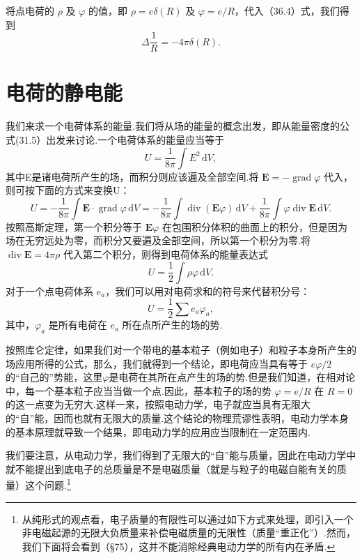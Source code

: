 将点电荷的 $\rho$ 及 $\varphi$ 的值，即 $\rho = e\delta(R)$ 及 $\varphi = e/R$，代入（36.4）式，我们得到
\begin{equation}
  \Delta\frac{1}{R}=-4\pi\delta(R).
\end{equation}

\section{电荷的静电能}

我们来求一个电荷体系的能量.我们将从场的能量的概念出发，即从能量密度的公式(31.5）出发来讨论.一个电荷体系的能量应当等于
\begin{equation*}
  U=\frac{1}{8\pi}\int E^2\,\mathrm{d}V,
\end{equation*}
其中E是诸电荷所产生的场，而积分则应该遍及全部空间.将 $\boldsymbol{E}=-\operatorname{grad}\varphi$ 代入，则可按下面的方式来变换U：
\begin{equation*}
  U=-\frac{1}{8\pi}\int\boldsymbol{E}\cdot\operatorname{grad}\varphi\,\mathrm{d}V
  =-\frac{1}{8\pi}\int\operatorname{div}(\boldsymbol{E}\varphi)\,\mathrm{d}V
  +\frac{1}{8\pi}\int\varphi\operatorname{div}\boldsymbol{E}\,\mathrm{d}V.
\end{equation*}
按照高斯定理，第一个积分等于 $\boldsymbol{E}\varphi$ 在包围积分体积的曲面上的积分，但是因为场在无穷远处为零，而积分又要遍及全部空间，所以第一个积分为零.将 $\operatorname{div}\boldsymbol{E}=4\pi\rho$ 代入第二个积分，则得到电荷体系的能量表达式
\begin{equation}
  U=\frac{1}{2}\int\rho\varphi\,\mathrm{d}V.
\end{equation}
对于一个点电荷体系 $e_a$，我们可以用对电荷求和的符号来代替积分号：
\begin{equation}
  U=\frac{1}{2}\sum e_a\varphi_a,
\end{equation}
其中，$\varphi_a$ 是所有电荷在 $e_a$ 所在点所产生的场的势.

按照库仑定律，如果我们对一个带电的基本粒子（例如电子）和粒子本身所产生的场应用所得的公式，那么，我们就得到一个结论，即电荷应当具有等于 $e\varphi/2$ 的“自己的”势能，这里$\varphi$是电荷在其所在点产生的场的势.但是我们知道，在相对论中，每一个基本粒子应当当做一个点.因此，基本粒子的场的势 $\varphi = e/R$ 在 $R = 0$ 的这一点变为无穷大.这样一来，按照电动力学，电子就应当具有无限大的“自”能，因而也就有无限大的质量.这个结论的物理荒谬性表明，电动力学本身的基本原理就导致一个结果，即电动力学的应用应当限制在一定范围内.

我们要注意，从电动力学，我们得到了无限大的“自”能与质量，因此在电动力学中就不能提出到底电子的总质量是不是电磁质量（就是与粒子的电磁自能有关的质量）这个问题.\footnote{从纯形式的观点看，电子质量的有限性可以通过如下方式来处理，即引入一个非电磁起源的无限大负质量来补偿电磁质量的无限性（质量“重正化”）.然而，我们下面将会看到（§75），这并不能消除经典电动力学的所有内在矛盾.}

